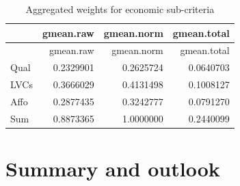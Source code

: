 \documentclass [oneside,10pt,a4paper,ngerman,BCOR10mm,headsepline,parindent,final]{scrartcl}
\begin{document}
    
    \begin{longtable}[]{@{}lrrr@{}}
\caption{Aggregated weights for economic sub-criteria}\tabularnewline
\toprule()
& gmean.raw & gmean.norm & gmean.total \\
\midrule()
\endfirsthead
\toprule()
& gmean.raw & gmean.norm & gmean.total \\
\midrule()
\endhead
Qual & 0.2329901 & 0.2625724 & 0.0640703 \\
LVCs & 0.3666029 & 0.4131498 & 0.1008127 \\
Affo & 0.2877435 & 0.3242777 & 0.0791270 \\
Sum & 0.8873365 & 1.0000000 & 0.2440099 \\
\bottomrule()
\end{longtable}

    
    \hypertarget{summary-and-outlook}{%
\section{Summary and outlook}\label{summary-and-outlook}}


    
    
    \printbibheading[heading=bibnumbered]
    \printbibliography[heading=subbibliography,keyword={URL},title={Online references}]
    \printbibliography[heading=subbibliography,keyword={book},title={Books, technical reports and others}]
    
\end{document}
